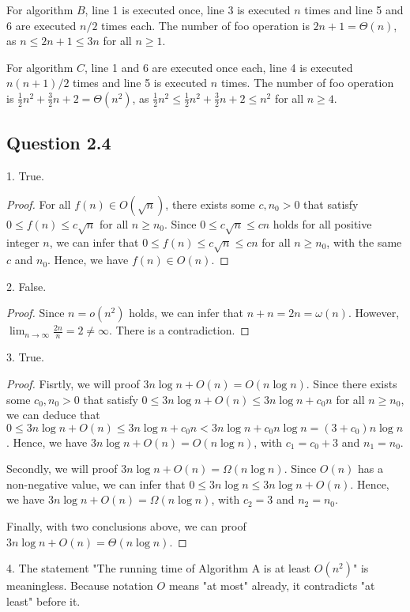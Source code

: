 \documentclass{article}
\begin{document}
For algorithm $B$, line 1 is executed once, line 3 is executed $n$ times and line 5 and 6 are executed $n/2$ times each.
The number of foo operation is $2n+1=\Theta(n)$, as $n \leq 2n+1 \leq 3n$ for all $n \geq 1$.

For algorithm $C$, line 1 and 6 are executed once each, line 4 is executed $n(n+1)/2$ times and line 5 is executed $n$ times.
The number of foo operation is $\frac{1}{2}n^2+\frac{3}{2}n+2=\Theta(n^2)$, as $\frac{1}{2}n^2 \leq \frac{1}{2}n^2+\frac{3}{2}n+2 \leq n^2$ for all $n \geq 4$.

\subsection*{Question 2.4}
1. True. 
\begin{proof}
    For all $f(n) \in O(\sqrt{n})$, there exists some $c, n_0 > 0$ that satisfy $0 \leq f(n) \leq c\sqrt{n}$ for all $n \geq n_0$. 
    Since $0 \leq c\sqrt{n} \leq cn$ holds for all positive integer $n$, we can infer that $0 \leq f(n) \leq c\sqrt{n} \leq cn$ for all $n \geq n_0$, with the same $c$ and $n_0$.
    Hence, we have $f(n) \in O(n)$.
\end{proof}

2. False.
\begin{proof}
    Since $n = o(n^2)$ holds, we can infer that $n+n=2n=\omega(n)$. 
    However, $\lim_{n \rightarrow \infty}\frac{2n}{n}=2\ne\infty$. 
    There is a contradiction.
\end{proof}

3. True.
\begin{proof}
    Fisrtly, we will proof $3n\log n + O(n) = O(n\log n)$. 
    Since there exists some $c_0, n_0 > 0$ that satisfy $0 \leq 3n\log n + O(n) \leq 3n\log n + c_0n$ for all $n \geq n_0$, we can deduce that $0 \leq 3n\log n + O(n) \leq 3n\log n + c_0n < 3n\log n + c_0n\log n = (3+c_0)n\log n$.
    Hence, we have $3n\log n + O(n) = O(n\log n)$, with $c_1 = c_0 + 3$ and $ n_1 = n_0$.

    Secondly, we will proof $3n\log n + O(n) = \Omega(n\log n)$. 
    Since $O(n)$ has a non-negative value, we can infer that $0 \leq 3n\log n \leq 3n\log n + O(n)$.
    Hence, we have $3n\log n + O(n) = \Omega(n\log n)$, with $c_2 = 3$ and $ n_2 = n_0$.

    Finally, with two conclusions above, we can proof $3n\log n + O(n) = \Theta(n\log n)$.
\end{proof}

4. The statement "The running time of Algorithm A is at least $O(n^2)$" is meaningless. 
Because notation $O$ means "at most" already, it contradicts "at least" before it.
\end{document}
